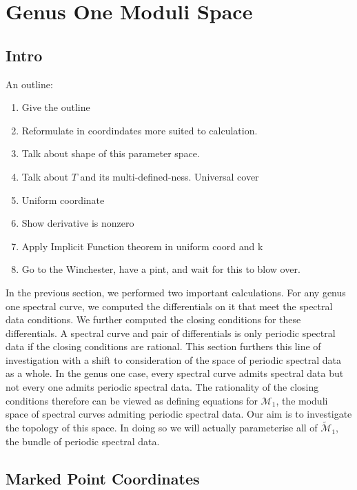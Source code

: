 
\chapter{Genus One Moduli Space}
\label{chp:Moduli Space}

\section{Intro}
\label{sec:Intro}

An outline:
\begin{enumerate}
\item
Give the outline
\item
Reformulate in coordindates more suited to calculation.
\item
Talk about shape of this parameter space.
\item
Talk about $T$ and its multi-defined-ness. Universal cover
\item
Uniform coordinate
\item
Show derivative is nonzero
\item
Apply Implicit Function theorem in uniform coord and k
\item
Go to the Winchester, have a pint, and wait for this to blow over.
\end{enumerate}


In the previous section, we performed two important calculations. For any genus one spectral curve, we computed the differentials on it that meet the spectral data conditions. We further computed the closing conditions for these differentials. A spectral curve and pair of differentials is only periodic spectral data if the closing conditions are rational. This section furthers this line of investigation with a shift to consideration of the space of periodic spectral data as a whole. In the genus one case, every spectral curve admits spectral data but not every one admits periodic spectral data. The rationality of the closing conditions therefore can be viewed as defining equations for $\mathcal{M}_1$, the moduli space of spectral curves admiting periodic spectral data. Our aim is to investigate the topology of this space. In doing so we will actually parameterise all of $\tilde{\mathcal{M}}_1$, the bundle of periodic spectral data.




\section{Marked Point Coordinates}
\label{sec:Reformulate}

